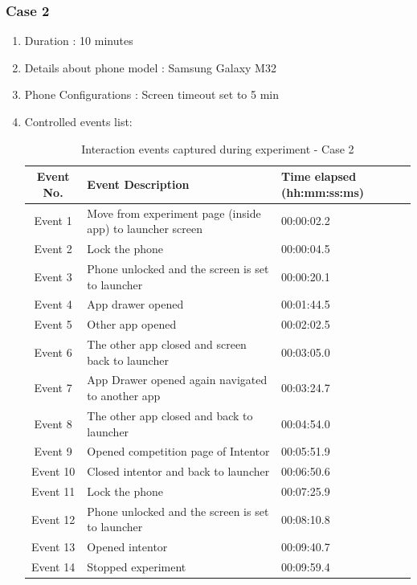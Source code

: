 \documentclass{article}
\begin{document}
\subsubsection{Case 2}
\begin{enumerate}
    \item Duration : 10 minutes
    \item Details about phone model : Samsung Galaxy M32
    \item Phone Configurations : Screen timeout set to 5 min
    \item Controlled events list:

    \begin{table}[htbp]
        \centering
        \begin{tabular}{c p{8cm} p{3cm}}
        \toprule
        \textbf{Event No.} & \textbf{Event Description} & \textbf{Time elapsed (hh:mm:ss:ms)} \\
        \midrule
        Event 1 & Move from experiment page (inside app) to launcher screen & 00:00:02.2\\
        Event 2 & Lock the phone & 00:00:04.5 \\
        Event 3 & Phone unlocked and the screen is set to launcher & 00:00:20.1 \\
        Event 4 & App drawer opened & 00:01:44.5 \\
        Event 5 & Other app opened & 00:02:02.5 \\
        Event 6 & The other app closed and screen back to launcher & 00:03:05.0 \\
        Event 7 & App Drawer opened again navigated to another app & 00:03:24.7 \\
        Event 8 & The other app closed and back to launcher & 00:04:54.0 \\
        Event 9 & Opened competition page of Intentor & 00:05:51.9 \\
        Event 10 & Closed intentor and back to launcher & 00:06:50.6 \\
        Event 11 & Lock the phone & 00:07:25.9 \\
        Event 12 & Phone unlocked and the screen is set to launcher & 00:08:10.8 \\
        Event 13 & Opened intentor & 00:09:40.7 \\
        Event 14 & Stopped experiment & 00:09:59.4 \\
        \bottomrule
        \end{tabular}
        \caption{Interaction events captured during experiment - Case 2}
        \label{tab:Interaction_events_captured_during_experiment_Case_2}
    \end{table}


\end{enumerate}
\end{document}
